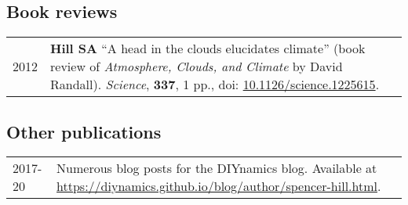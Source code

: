 \documentclass[letterpaper,11pt]{shillcv}
\begin{document}
\subsection*{Book reviews}
\begin{longtable}{@{}  Y{0.05\textwidth} L{0.95\textwidth} @{}}
2012 & \textbf{Hill SA}  ``A head in the clouds elucidates climate'' (book
review of \emph{Atmosphere, Clouds, and Climate} by David Randall).  \emph{Science}, \textbf{337},
1 pp., doi: \href{http://dx.doi.org/10.1126/science.1225615}{10.1126/science.1225615}.\\
\end{longtable}

\subsection*{Other publications}
\begin{longtable}{@{}  Y{0.08\textwidth} L{0.92\textwidth} @{}}
2017-20 &  \raggedright Numerous blog posts for the DIYnamics blog.  Available at \href{https://diynamics.github.io/blog/author/spencer-hill.html}{https://diynamics.github.io/blog/author/spencer-hill.html}.\\


\end{longtable}
\end{document}
